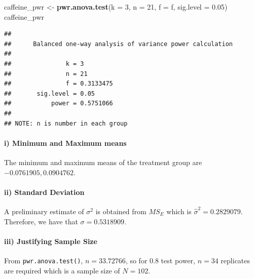 \documentclass[
]{article}
\newenvironment{Shaded}{\begin{snugshade}}{\end{snugshade}}
\newcommand{\AttributeTok}[1]{\textcolor[rgb]{0.13,0.29,0.53}{#1}}
\newcommand{\DecValTok}[1]{\textcolor[rgb]{0.00,0.00,0.81}{#1}}
\newcommand{\FloatTok}[1]{\textcolor[rgb]{0.00,0.00,0.81}{#1}}
\newcommand{\FunctionTok}[1]{\textcolor[rgb]{0.13,0.29,0.53}{\textbf{#1}}}
\newcommand{\NormalTok}[1]{#1}
\newcommand{\OtherTok}[1]{\textcolor[rgb]{0.56,0.35,0.01}{#1}}
\newcommand{\SpecialCharTok}[1]{\textcolor[rgb]{0.81,0.36,0.00}{\textbf{#1}}}
\begin{document}
\begin{Shaded}
\begin{Highlighting}[]
\NormalTok{caffeine\_pwr }\OtherTok{\textless{}{-}} \FunctionTok{pwr.anova.test}\NormalTok{(}\AttributeTok{k =} \DecValTok{3}\NormalTok{, }\AttributeTok{n =} \DecValTok{21}\NormalTok{, }\AttributeTok{f =}\NormalTok{ f, }\AttributeTok{sig.level =} \FloatTok{0.05}\NormalTok{)}
\NormalTok{caffeine\_pwr}
\end{Highlighting}
\end{Shaded}

\begin{verbatim}
## 
##      Balanced one-way analysis of variance power calculation 
## 
##               k = 3
##               n = 21
##               f = 0.3133475
##       sig.level = 0.05
##           power = 0.5751066
## 
## NOTE: n is number in each group
\end{verbatim}

\begin{Shaded}
\end{Shaded}

\paragraph{i) Minimum and Maximum
means}\label{i-minimum-and-maximum-means}

The minimum and maximum means of the treatment group are
\(-0.0761905, 0.0904762\).

\paragraph{ii) Standard Deviation}\label{ii-standard-deviation}

A preliminary estimate of \(\sigma^2\) is obtained from \(MS_E\) which
is \(\hat\sigma^2 = 0.2829079\). Therefore, we have that
\(\sigma = 0.5318909\).

\paragraph{iii) Justifying Sample
Size}\label{iii-justifying-sample-size}

From \texttt{pwr.anova.test()}, \(n = 33.72766\), so for 0.8 test power,
\(n=34\) replicates are required which is a sample size of \(N=102\).
\end{document}
